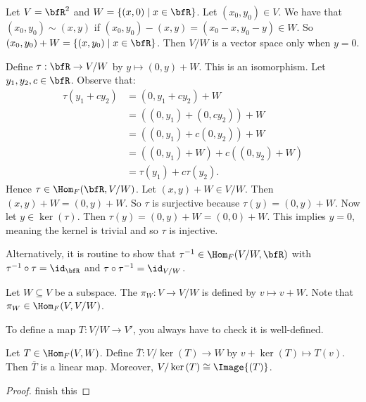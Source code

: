     \begin{example}
        Let $V = \bfR^2$ and $W = \{(x,0) \mid x \in \bfR \}$. Let $(x_0 ,y_0) \in V$. We have that $(x_0,y_0) \sim (x,y)$ if $(x_0,y_0) - (x,y) = (x_0 - x, y_0 - y) \in W$. So $(x_0,y_0) + W = \{(x,y_0) \mid x \in \bfR\}$. Then $V/W$ is a vector space only when $y = 0$.

        Define $\tau : \bfR \rightarrow V/W$ by $y \mapsto (0,y) + W$. This is an isomorphism. Let $y_1,y_2,c \in \bfR$. Observe that:
            \begin{equation*}
            \begin{split}
                \tau(y_1 + c y_2)
                & = (0,y_1 + c y_2) + W \\
                & = ((0,y_1) + (0,cy_2)) + W \\
                & = ((0,y_1) + c(0,y_2)) + W \\
                & = ((0,y_1) + W) + c((0,y_2) + W)\\
                & = \tau(y_1) + c\tau(y_2).
            \end{split}
            \end{equation*}
        Hence $\tau \in \Hom_F{(\bfR, V/W)}$. Let $(x,y) + W \in V/W$. Then $(x,y) + W = (0,y) + W$. So $\tau$ is surjective because $\tau(y) = (0,y) + W$. Now let $y \in \ker{(\tau)}$. Then $\tau(y) = (0,y)+ W = (0,0) + W$. This implies $y=0$, meaning the kernel is trivial and so $\tau$ is injective.
        
        Alternatively, it is routine to show that $\tau^{-1} \in \Hom_F{(V/W,\bfR)}$ with $\tau^{-1} \circ \tau = \id_\bfR$ and $\tau \circ \tau^{-1} = \id_{V/W}$.
    \end{example}

    \begin{definition}
        Let $W \subseteq V$ be a subspace. The  $\pi_W:V \rightarrow V/W$ is defined by $v \mapsto v+W$. Note that $\pi_W \in \Hom_F{(V,V/W)}$.
    \end{definition}

    \begin{note}
    To define a map $T:V/W \rightarrow V'$, you always have to check it is well-defined.
    \end{note}

    \begin{theorem}
        Let $T \in \Hom_F{(V,W)}$. Define $\overline{T}:V/\ker{(T)} \rightarrow W$ by $v + \ker{(T)} \mapsto T(v)$. Then $\overline{T}$ is a linear map. Moreover, $V/\ker{(T)} \cong \Image{(T)}$.
    \end{theorem}
        \begin{proof}
            \color{red} finish this
        \end{proof}
    
